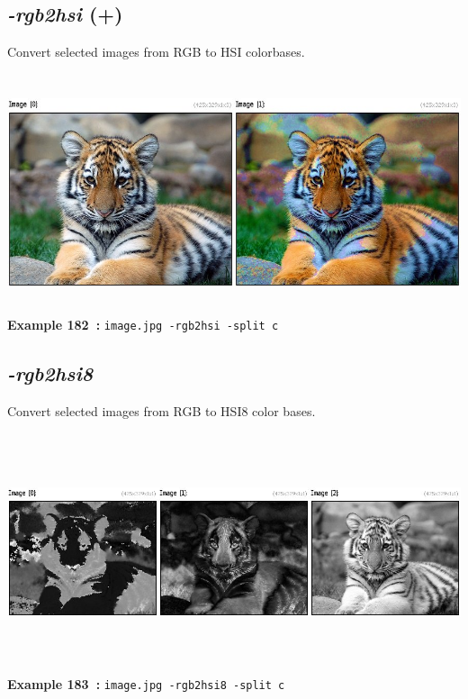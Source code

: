 \documentclass[a4paper,11pt,twoside]{book}
\begin{document}
\subsection{\emph{-rgb2hsi} (+)}\vspace*{-0.5em}
Convert selected images from RGB to HSI colorbases.
\begin{center}\includegraphics[keepaspectratio=true,height=7cm,width=\textwidth]{img/gmic_def182.jpg}\\
{\footnotesize \textbf{Example 182~:} \texttt{image.jpg -rgb2hsi -split c}}
\end{center}

\subsection{\emph{-rgb2hsi8} }\vspace*{-0.5em}
Convert selected images from RGB to HSI8 color bases.
\begin{center}\includegraphics[keepaspectratio=true,height=7cm,width=\textwidth]{img/gmic_def183.jpg}\\
{\footnotesize \textbf{Example 183~:} \texttt{image.jpg -rgb2hsi8 -split c}}
\end{center}
\end{document}
